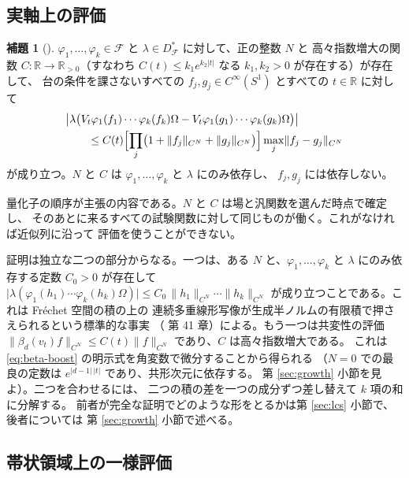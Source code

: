 \documentclass[11pt,a4paper]{article}
\newcommand{\Circ}{S^{1}}
\newcommand{\Fields}{\mathcal{F}}
\newcommand{\Dom}{D}
\newcommand{\CN}[1]{\lVert #1 \rVert_{C^{N}}}
\newcommand{\abs}[1]{\lvert #1 \rvert}
\newcommand{\Dstar}{\Dom^{*}_{\Fields}}
\theoremstyle{definition}
\newtheorem{lemma}[theorem]{補題}
\newcommand{\srcnum}[1]{\renewcommand{\thetheorem}{#1}}
\begin{document}
\subsection{実軸上の評価}

\srcnum{3.8}
\begin{lemma}[\cite{T26}]
\label{lem:38}
$\varphi_1, \dots, \varphi_k \in \Fields$ と $\lambda \in \Dstar$ に対して、正の整数 $N$ と
高々指数増大の関数 $C : \mathbb{R} \to \mathbb{R}_{>0}$（すなわち
$C(t) \le k_1 e^{k_2\abs{t}}$ なる $k_1, k_2 > 0$ が存在する）が存在して、
台の条件を課さないすべての $f_j, g_j \in C^\infty(\Circ)$ とすべての $t \in \mathbb{R}$ に対して
\[
  \begin{aligned}
    &\bigl\lvert \lambda\bigl(V_t \varphi_1(f_1)\cdots\varphi_k(f_k)\Omega
      - V_t \varphi_1(g_1)\cdots\varphi_k(g_k)\Omega\bigr)\bigr\rvert \\
    &\qquad \le C(t)
      \Bigl[\prod_{j} \bigl(1 + \CN{f_j} + \CN{g_j}\bigr)\Bigr] \max_j \CN{f_j - g_j}
  \end{aligned}
\]
が成り立つ。$N$ と $C$ は $\varphi_1, \dots, \varphi_k$ と $\lambda$ にのみ依存し、
$f_j, g_j$ には依存しない。
\end{lemma}

量化子の順序が主張の内容である。$N$ と $C$ は場と汎関数を選んだ時点で確定し、
そのあとに来るすべての試験関数に対して同じものが働く。これがなければ近似列に沿って
評価を使うことができない。

証明は独立な二つの部分からなる。一つは、ある $N$ と、$\varphi_1, \dots, \varphi_k$ と
$\lambda$ にのみ依存する定数 $C_0 > 0$ が存在して
$\lvert\lambda(\varphi_1(h_1)\cdots\varphi_k(h_k)\Omega)\rvert \le C_0\, \CN{h_1}\cdots\CN{h_k}$
が成り立つことである。これは Fr\'echet 空間の積の上の
連続多重線形写像が生成半ノルムの有限積で押さえられるという標準的な事実
（\cite{Treves} 第 41 章）による。もう一つは共変性の評価
$\CN{\beta_d(v_t) f} \le C(t)\CN{f}$ であり、$C$ は高々指数増大である。
これは \eqref{eq:beta-boost} の明示式を角変数で微分することから得られる
（$N = 0$ での最良の定数は $e^{\abs{d-1}\,\abs{t}}$ であり、共形次元に依存する。
第 \ref{sec:growth} 小節を見よ）。二つを合わせるには、
二つの積の差を一つの成分ずつ差し替えて $k$ 項の和に分解する。
前者が完全な証明でどのような形をとるかは第 \ref{sec:lcs} 小節で、後者については
第 \ref{sec:growth} 小節で述べる。

\subsection{帯状領域上の一様評価}
\end{document}
